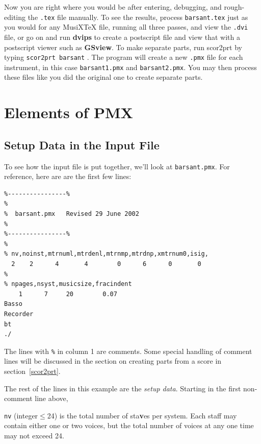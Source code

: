 \documentclass[11pt]{article}
\def\MusiXTeX{MusiX\TeX}
\def\newfrom{2.59}  %
\def\NEW#1{\ifdim#1 pt<\newfrom pt\else%
\marginpar{\fbox{#1}}\fi}
\begin{document}
Now you are right where you would be after 
entering, debugging, and rough-editing the {\tt .tex} file manually.  To see 
the results, process {\tt barsant.tex} just as you would for any \MusiXTeX{} 
file, running all three passes, and view the {\tt .dvi} file, or go on and run 
{\bf dvips} to create a postscript file and view that with a postscript viewer
such as {\bf GSview}.  To make 
separate parts, run {\bfx scor2prt} by typing {\tt scor2prt barsant} .\NEW{2.0} 
The program will create a new {\tt .pmx} file for each instrument, in this
case {\tt barsant1.pmx} and {\tt barsant2.pmx}.
You may then process these 
files like you did the original one to create separate parts.

\section{Elements of PMX}
\def\l@subsection{\@dottedtocline{2}{5em}{20em}}%

\subsection{Setup Data in the Input File} \label{setupdata}

	To see how the input file is put together, we'll look at 
{\tt barsant.pmx}.  For reference, here are are the first few lines:  
\pagebreak
\begin{verbatim}
%----------------%
%
%  barsant.pmx   Revised 29 June 2002
% 
%----------------%
%
% nv,noinst,mtrnuml,mtrdenl,mtrnmp,mtrdnp,xmtrnum0,isig,
  2    2      4       4        0      6      0       0 
%
% npages,nsyst,musicsize,fracindent
    1      7     20        0.07
Basso
Recorder
bt
./
\end{verbatim}
The lines 
with {\tt \%} in column 1 are comments.  
Some special handling of comment lines will be 
discussed in the section on creating parts from a score in  
section~\ref{scor2prt}.
   
The rest of the lines in this example are the {\it setup data}.  
Starting in the first non-comment line above,   

{\tt nv} (integer$\leq$24) \NEW{2.6} is the total number of 
sta{\bf v}es per system.  Each staff may contain either one or two voices,
but the total number of voices at any one time may not exceed 24.
\end{document}
